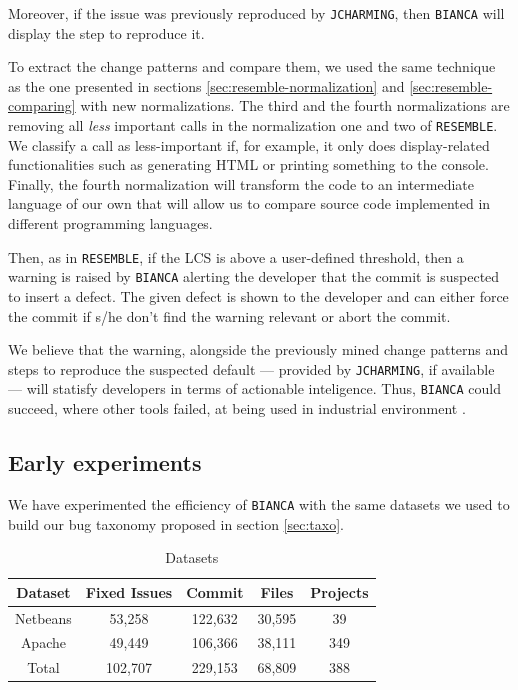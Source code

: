 Moreover, if the issue was previously reproduced by {\tt JCHARMING}, then {\tt BIANCA} will display the step to reproduce it.


To extract the change patterns and compare them, we used the same technique as the one presented in sections \ref{sec:resemble-normalization} and \ref{sec:resemble-comparing} with new normalizations.
The third and the fourth normalizations are removing all {\it less} important calls in the normalization one and two of {\tt RESEMBLE}.
We classify a call as less-important if, for example, it only does display-related functionalities such as generating HTML or printing something to the console. Finally, the fourth normalization will transform the code to an intermediate language of our own that will allow us to compare source code implemented in different programming languages.

Then, as in {\tt RESEMBLE}, if the LCS is above a user-defined threshold, then a warning is raised by {\tt BIANCA} alerting the developer that the commit is suspected to insert a defect.
The given defect is shown to the developer and can either force the commit if s/he don't find the warning relevant or abort the commit.

We believe that the warning, alongside the previously mined change patterns and steps to reproduce the suspected default --- provided by {\tt JCHARMING}, if available --- will statisfy developers in terms of actionable inteligence.
Thus, {\tt BIANCA} could succeed, where other tools failed, at being used in industrial environment	\cite{Lewis2013}.


\subsection{Early experiments}

We have experimented the efficiency of {\tt BIANCA} with the same datasets we used to build our bug taxonomy proposed in section \ref{sec:taxo}.

\begin{table}[h]
\begin{center}
\begin{tabular}{@{}c|c|c|c|c@{}}
\textbf{Dataset} & \textbf{Fixed Issues} & \textbf{Commit} & \textbf{Files} & \textbf{Projects} \\ \hline \hline
Netbeans         & 53,258          & 122,632     & 30,595         & 39                \\
Apache           & 49,449          & 106,366     & 38,111         & 349               \\
Total            & 102,707         & 229,153     & 68,809         & 388               \\ \hline \hline

\end{tabular}
\end{center}

\caption{Datasets\label{table:datasets-bianca}}
\end{table}

